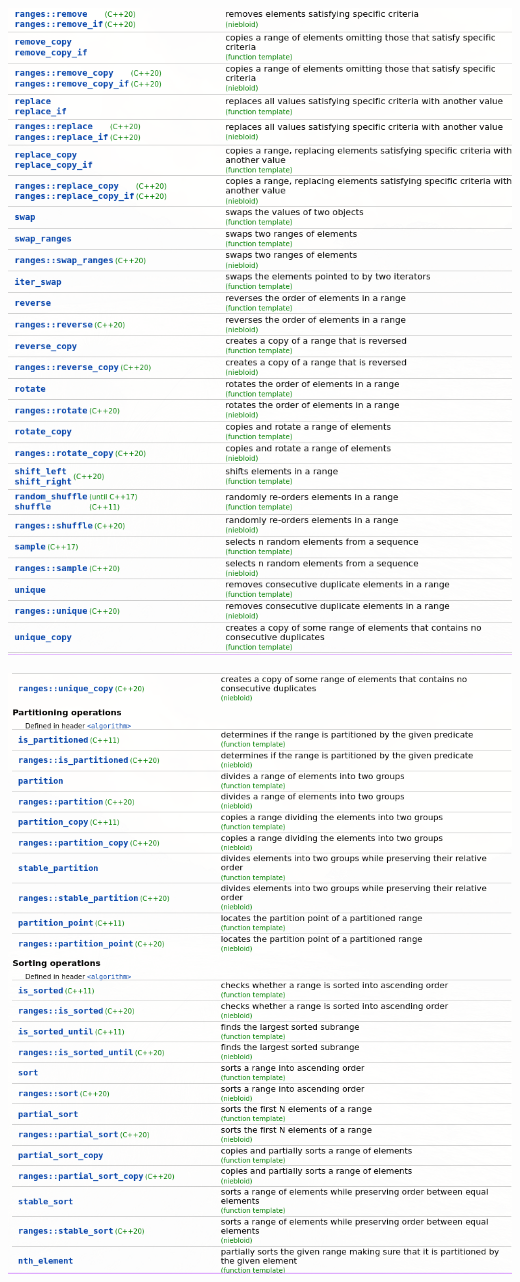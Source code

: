 \documentclass[11pt,twoside,twocolumn,landscape]{article}
\begin{document}
\begin{center}
\includegraphics[width=.9\linewidth]{img/algorithm_3.png}
\end{center}
\begin{center}
\includegraphics[width=.9\linewidth]{img/algorithm_4.png}
\end{center}
\end{document}
